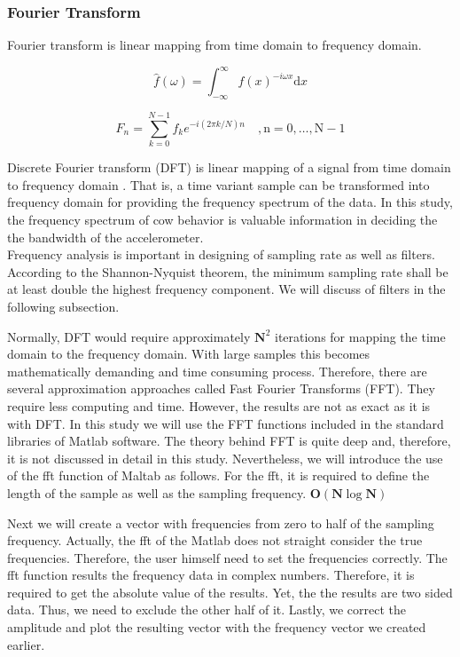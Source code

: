 \documentclass[english,12pt,a4paper,pdftex,elec,utf8]{aaltothesis}
\begin{document}
\subsubsection{Fourier Transform} \label{fouriertransformsection}

Fourier transform is linear mapping from time domain to frequency domain.

\begin{equation}
\hat{f}(\omega) =  \int_{- \infty} ^{\infty} f(x) ^{-i\omega x} \mathrm{d}x
\end{equation} \label{fouriertransformequation}

\begin{equation}
F_n =  \sum \limits^{N-1}_{k=0} f_k e^{-i(2\pi k / N) n} \mathrm{\hspace{1em} , n = 0, \dots , N -1} 
\end{equation}\label{fftequation}

Discrete Fourier transform (DFT) is linear mapping of a signal from time domain to frequency domain \cite{rao2012fast}. That is, a time variant sample can be transformed into frequency domain for providing the frequency spectrum of the data. In this study, the frequency spectrum of cow behavior is valuable information in deciding the the bandwidth of the accelerometer.\\


Frequency analysis is important in designing of sampling rate as well as filters. According to the Shannon-Nyquist theorem, the minimum sampling rate shall be at least double the highest frequency component. We will discuss of filters in the following subsection.

Normally, DFT would require approximately $\mathbf{N}^2$ iterations for mapping the time domain to the frequency domain. With large samples this becomes mathematically demanding and time consuming process. Therefore, there are several approximation approaches called Fast Fourier Transforms (FFT). They require less computing and time. However, the results are not as exact as it is with DFT. In this study we will use the FFT functions included in the standard libraries of Matlab software. The theory behind FFT is quite deep and, therefore, it is not discussed in detail in this study. Nevertheless, we will introduce the use of the fft function of Maltab as follows. For the fft, it is required to define the length of the sample as well as the sampling frequency. $\mathbf{O}( \mathbf{N} \log \mathbf{N})$

Next we will create a vector with frequencies from zero to half of the sampling frequency. Actually, the fft of the Matlab does not straight consider the true frequencies. Therefore, the user himself need to set the frequencies correctly. The fft function results the frequency data in complex numbers. Therefore, it is required to get the absolute value of the results. Yet, the the results are two sided data. Thus, we need to exclude the other half of it. Lastly, we correct the amplitude and plot the resulting vector with the frequency vector we created earlier.
\end{document}
